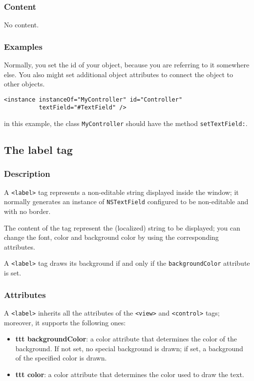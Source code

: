\subsubsection{Content}
No content.

\subsubsection{Examples}
Normally, you set the id of your object, because you are referring to
it somewhere else.  You also might set additional object attributes to
connect the object to other objects.
\begin{verbatim}
<instance instanceOf="MyController" id="Controller" 
          textField="#TextField" />
\end{verbatim}
in this example, the class \texttt{MyController} should have the method
\texttt{setTextField:}.

\subsection{The label tag}

\subsubsection{Description}
A \texttt{<label>} tag represents a non-editable string displayed
inside the window; it normally generates an instance of
\texttt{NSTextField} configured to be non-editable and with no border.

The content of the tag represent the (localized) string to be
displayed; you can change the font, color and background color by
using the corresponding attributes.

A \texttt{<label>} tag draws its background if and only if the
\texttt{backgroundColor} attribute is set.

\subsubsection{Attributes}
A \texttt{<label>} inherits all the attributes of the \texttt{<view>}
and \texttt{<control>} tags; moreover, it supports the following ones:
\begin{itemize}
\item {\bf ttt backgroundColor}: a color attribute that determines the
  color of the background.  If not set, no special background is
  drawn; if set, a background of the specified color is drawn.
\item {\bf ttt color}: a color attribute that determines the color
  used to draw the text.
\end{itemize}

